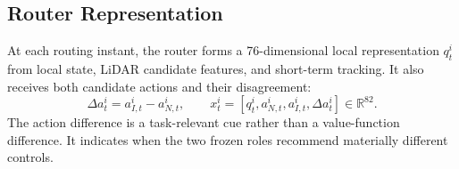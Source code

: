 \documentclass[letterpaper,10pt,conference]{ieeeconf}
\begin{document}
\subsection{Router Representation}
At each routing instant, the router forms a 76-dimensional local representation $q_t^i$ from local state, LiDAR candidate features, and short-term tracking. It also receives both candidate actions and their disagreement:
\begin{equation}
 \Delta a_t^i=a_{I,t}^i-a_{N,t}^i,\qquad x_t^i=[q_t^i,a_{N,t}^i,a_{I,t}^i,\Delta a_t^i]\in\mathbb{R}^{82}.
 \label{eq:routerinput}
\end{equation}
The action difference is a task-relevant cue rather than a value-function difference. It indicates when the two frozen roles recommend materially different controls.
\end{document}
